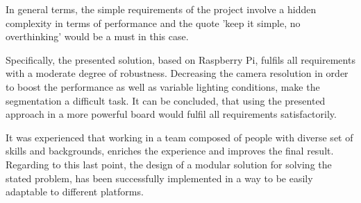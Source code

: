 In general terms, the simple requirements of the project involve a hidden complexity in terms of performance and the quote 'keep it simple, no overthinking' would be a must in this case.

Specifically, the presented solution, based on Raspberry Pi, fulfils all requirements with a moderate degree of robustness. Decreasing the camera resolution in order to boost the performance as well as variable lighting conditions, make the segmentation a difficult task. It can be concluded, that using the presented approach in a more powerful board would fulfil all requirements satisfactorily.

It was experienced that working in a team composed of people with diverse set of skills and backgrounds, enriches the experience and improves the final result. Regarding to this last point, the design of a modular solution for solving the stated problem, has been successfully implemented in a way to be easily adaptable to different platforms.